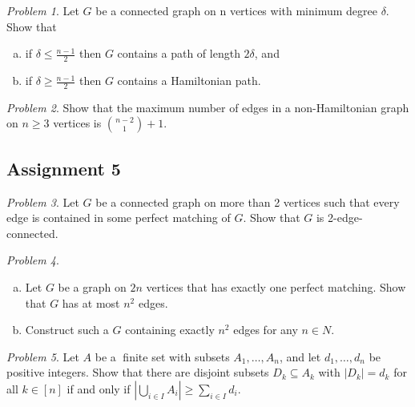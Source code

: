 \documentclass[11pt, fleqn, a4paper, landscape]{article}
\theoremstyle{plain} %
\theoremstyle{remark} %
\newtheorem{problem}{Problem}
\theoremstyle{definition} %
\begin{document}
\begin{multicols}{3}
\begin{problem}
Let $G$ be a connected graph on n vertices with minimum degree $\delta$. Show that 
\begin{enumerate}[(a)]
\item if $\delta \le \frac{n-1}{2}$ then $G$ contains a path of length $2\delta$, and
\item if $\delta \ge \frac{n-1}{2}$ then $G$ contains a Hamiltonian path.
\end{enumerate}
\end{problem}

\begin{problem}
Show that the maximum number of edges in a non-Hamiltonian graph on $n \ge 3$
vertices is $\binom{n-2}{1}+1$.
\end{problem}

\subsection{Assignment 5}

\begin{problem}
Let $G$ be a connected graph on more than 2 vertices such that every edge is
contained in some perfect matching of $G$. Show that $G$ is 2-edge-connected.
\end{problem}

\begin{problem}
\begin{enumerate}[(a)]
\item Let $G$ be a graph on $2n$ vertices that has exactly one perfect matching. Show that $G$ has at most $n^2$ edges.
\item Construct such a $G$ containing exactly $n^2$ edges for any $n \in N$.
\end{enumerate}
\end{problem}

\begin{problem}
Let $A$ be a finite set with subsets $A_1,\dots, A_n$, and let $d_1,\dots, d_n$ be positive integers. Show that there are disjoint subsets $D_k \subseteq A_k$ with $|D_k| = d_k$ for all $k \in [n]$ if and
only if $|\bigcup_{i\in I}A_i|\ge \sum_{i\in I}d_i$.
\end{problem}


\end{multicols}
\end{document}
